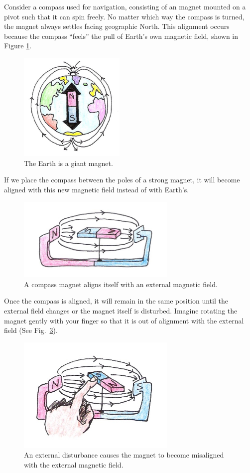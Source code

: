 Consider a compass used for navigation, consisting of an magnet mounted on a pivot such that it can spin freely.  No matter which way the compass is turned, the magnet always settles facing geographic North.  This alignment occurs because the compass ``feels'' the pull of Earth’s own magnetic field, shown in Figure \ref{Fig9-8}.  
\begin{figure}[h]
	\centering
	\includegraphics[width=2.0in]{./figures/Topic9/Fig9-8.jpg}
	\caption{The Earth is a giant magnet.}
 	\label{Fig9-8}
\end{figure}
If we place the compass between the poles of a strong magnet, it will become aligned with this new magnetic field instead of with Earth's.
\begin{figure}[h]
	\centering
	\includegraphics[width=3.0in]{./figures/Topic9/Fig9-9.jpg}
	\caption{A compass magnet aligns itself with an external magnetic field.}
 	\label{Fig9-9}
\end{figure}
Once the compass is aligned, it will remain in the same position until the external field changes or the magnet itself is disturbed.  Imagine rotating the magnet gently with your finger so that it is out of alignment with the external field (See Fig.~\ref{Fig9-10}).
\begin{figure}[h]
	\centering
	\includegraphics[width=3.0in]{./figures/Topic9/Fig9-10.jpg}
	\caption{ An external disturbance causes the magnet to become misaligned with the external magnetic field.}
 	\label{Fig9-10}
\end{figure} 
